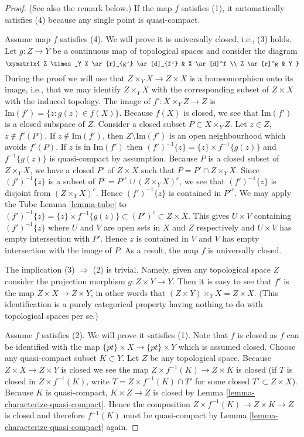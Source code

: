 \begin{proof}
(See also the remark below.)
If the map $f$ satisfies (1), it automatically satisfies (4) because
any single point is quasi-compact.

\medskip\noindent
Assume map $f$ satisfies (4).
We  will prove it is universally closed, i.e., (3) holds.
Let $g : Z \to Y$ be a continuous map of topological spaces
and consider the diagram
$$
\xymatrix{
Z \times_Y X \ar[r]_{g'} \ar[d]_{f'} & X \ar[d]^f \\
Z \ar[r]^g & Y
}
$$
During the proof we will use that $Z \times_Y X \to Z \times X$
is a homeomorphism onto its image, i.e., that we may identify
$Z \times_Y X$ with the corresponding subset of $Z \times X$ with
the induced topology.
The image of $f' : X \times_Y Z \to Z$ is
$\text{Im}(f') = \{z : g(z) \in f(X)\}$.
Because $f(X)$ is closed, we see that
$\text{Im}(f')$ is a closed subspace of $Z$.
Consider a closed subset $P \subset X \times_Y Z$.
Let $z \in Z$, $z \not \in f'(P)$.
If $z \not \in \text{Im}(f')$, then $Z \setminus \text{Im}(f')$
is an open neighbourhood which avoids $f'(P)$.
If $z$ is in $\text{Im}(f')$
then $(f')^{-1}\{z\} = \{z\} \times f^{-1}\{g(z)\}$
and $f^{-1}\{g(z)\}$
is quasi-compact by assumption. Because $P$ is a closed
subset of $Z \times_Y X$, we have a closed $P'$ of $Z \times X$ such
that $P = P' \cap Z \times_Y X$.
Since $(f')^{-1}\{z\}$ is a subset of $P^c = P'^c \cup (Z \times_Y X)^c$,
we see that $(f')^{-1}\{z\}$ is disjoint from $(Z \times_Y X)^c$.
Hence $(f')^{-1}\{z\}$ is contained in $P'^c$.
We may apply the Tube Lemma \ref{lemma-tube} to
$(f')^{-1}\{z\} = \{z\} \times f^{-1}\{g(z)\}
\subset (P')^c \subset Z \times X$.
This gives $U \times V$ containing
$(f')^{-1}\{z\}$ where $U$ and $V$ are open sets in $X$ and $Z$
respectively and $U \times V$ has empty intersection with $P'$. Hence
$z$ is contained in $V$ and $V$ has empty intersection with the image
of $P$. As a result, the map $f$ is universally closed.

\medskip\noindent
The implication (3) $\Rightarrow$ (2) is trivial.
Namely, given any topological space $Z$ consider the projection
morphism $g : Z \times Y \to Y$. Then it is easy to see
that $f'$ is the map $Z \times X \to Z \times Y$, in other
words that $(Z \times Y) \times_Y X = Z \times X$. (This identification
is a purely categorical property having nothing to do with
topological spaces per se.)

\medskip\noindent
Assume $f$ satisfies (2). We will prove it satisfies (1).
Note that $f$ is closed as $f$ can be identified with the map
$\{pt\} \times X \to \{pt\} \times Y$ which is assumed closed.
Choose any quasi-compact subset $K \subset Y$.
Let $Z$ be any topological space.
Because $Z \times X \to Z \times Y$ is closed
we see the map $Z \times f^{-1}(K) \to Z \times K$
is closed (if $T$ is closed in $Z \times f^{-1}(K)$, write
$T = Z \times f^{-1}(K) \cap T'$ for some closed
$T' \subset Z \times X$). Because $K$ is quasi-compact,
$K \times Z\to Z$ is closed by Lemma \ref{lemma-characterize-quasi-compact}.
Hence the composition $Z \times f^{-1}(K)\to Z \times K \to Z$
is closed and therefore $f^{-1}(K)$ must be quasi-compact
by Lemma \ref{lemma-characterize-quasi-compact} again.
\end{proof}

